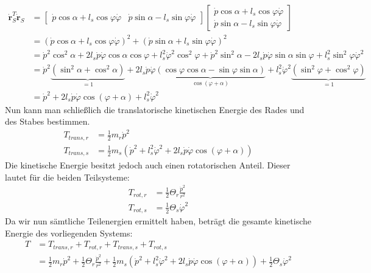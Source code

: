	\begin{align*}
		\dot{\textbf{r}}_S^T\dot{\textbf{r}}_S &= \left[\begin{matrix}
		\dot{p}\cos\alpha + l_s\cos\varphi\dot{\varphi} & \dot{p}\sin\alpha - l_s\sin\varphi\dot{\varphi}
		\end{matrix}\right] \left[\begin{matrix}
		\dot{p}\cos\alpha + l_s\cos\varphi\dot{\varphi} \\
		\dot{p}\sin\alpha - l_s\sin\varphi\dot{\varphi}
		\end{matrix}\right] \\
		&=\left(\dot{p}\cos\alpha + l_s\cos\varphi\dot{\varphi}\right)^2 + \left(\dot{p}\sin\alpha + l_s\sin\varphi\dot{\varphi}\right)^2 \\
		&=\dot{p}^2\cos^2\alpha + 2l_s\dot{p}\dot{\varphi}\cos\alpha\cos\varphi + l_s^2\dot{\varphi}^2\cos^2\varphi + \dot{p}^2\sin^2\alpha - 2l_s\dot{p}\dot{\varphi}\sin\alpha\sin\varphi + l_s^2\sin^2\varphi\dot{\varphi}^2 \\
		&=\dot{p}^2\underbrace{\left(\sin^2\alpha + \cos^2\alpha\right)}_{=1} + 2l_s\dot{p}\dot{\varphi}\underbrace{\left(\cos\varphi\cos\alpha - \sin\varphi\sin\alpha\right)}_{\cos\left(\varphi + \alpha\right)} + l_s^2\dot{\varphi}^2\underbrace{\left(\sin^2\varphi + \cos^2\varphi\right)}_{=1} \\
		&= \dot{p}^2 + 2l_s\dot{p}\dot{\varphi}\cos\left(\varphi + \alpha\right) + l_s^2\dot{\varphi}^2
	\end{align*}
	Nun kann man schließlich die translatorische kinetischen Energie des Rades und des Stabes bestimmen.
	\begin{align*}
		T_{trans,r} &=  \frac{1}{2}m_r\dot{p}^2\\
		T_{trans,s} &=  \frac{1}{2}m_s\left(\dot{p}^2 + l_s^2\dot{\varphi}^2 + 2l_s\dot{p}\dot {\varphi}\cos\left(\varphi + \alpha\right)\right)
	\end{align*}
	Die kinetische Energie besitzt jedoch auch einen rotatorischen Anteil. Dieser lautet für die beiden Teilsysteme:
	\begin{align*}
		T_{rot,r} &= \frac{1}{2} \Theta_r \frac{\dot{p}^2}{r^2} \\
		T_{rot,s} &= \frac{1}{2} \Theta_s \dot{\varphi}^2
	\end{align*}
	Da wir nun sämtliche Teilenergien ermittelt haben, beträgt die gesamte kinetische Energie des vorliegenden Systems:
	\begin{align*}
		T &= T_{trans,r} + T_{rot,r} + T_{trans,s} + T_{rot,s}\\
		  &= \frac{1}{2}m_r\dot{p}^2 + \frac{1}{2} \Theta_r \frac{\dot{p}^2}{r^2} + \frac{1}{2}m_s\left(\dot{p}^2 + l_s^2\dot{\varphi}^2 + 2l_s\dot{p}\dot{\varphi}\cos\left(\varphi + \alpha\right)\right) + \frac{1}{2} \Theta_s \dot{\varphi}^2
	\end{align*}
